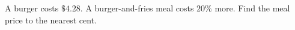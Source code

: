 A burger costs $\$4.28$. A burger-and-fries meal costs $20\%$ more. Find the meal price to the nearest cent.
